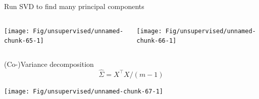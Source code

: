 \documentclass[
  ignorenonframetext,
  aspectratio=169]{beamer}
\newenvironment{Shaded}{\begin{snugshade}}{\end{snugshade}}
\newcommand{\AttributeTok}[1]{\textcolor[rgb]{0.77,0.63,0.00}{#1}}
\newcommand{\DecValTok}[1]{\textcolor[rgb]{0.00,0.00,0.81}{#1}}
\newcommand{\FunctionTok}[1]{\textcolor[rgb]{0.00,0.00,0.00}{#1}}
\newcommand{\NormalTok}[1]{#1}
\newcommand{\OtherTok}[1]{\textcolor[rgb]{0.56,0.35,0.01}{#1}}
\newcommand{\SpecialCharTok}[1]{\textcolor[rgb]{0.00,0.00,0.00}{#1}}
\begin{document}
\begin{frame}[fragile]{Run SVD to find many principal components}
\protect\hypertarget{run-svd-to-find-many-principal-components}{}
\large

\begin{Shaded}
\end{Shaded}

\normalsize

\begin{columns}[T]
\begin{column}{.25\textwidth}
\scriptsize

\begin{center}\texttt{[image: Fig/unsupervised/unnamed-chunk-65-1]} \end{center}

\normalsize
\end{column}

\begin{column}{.65\textwidth}
\scriptsize

\begin{center}\texttt{[image: Fig/unsupervised/unnamed-chunk-66-1]} \end{center}

\normalsize
\end{column}
\end{columns}
\end{frame}

\begin{frame}{(Co-)Variance decomposition}
\protect\hypertarget{co-variance-decomposition}{}
\[\hat{\Sigma} = X^{\top}X/(m-1)\]

\scriptsize

\begin{center}\texttt{[image: Fig/unsupervised/unnamed-chunk-67-1]} \end{center}

\normalsize
\end{frame}
\end{document}
